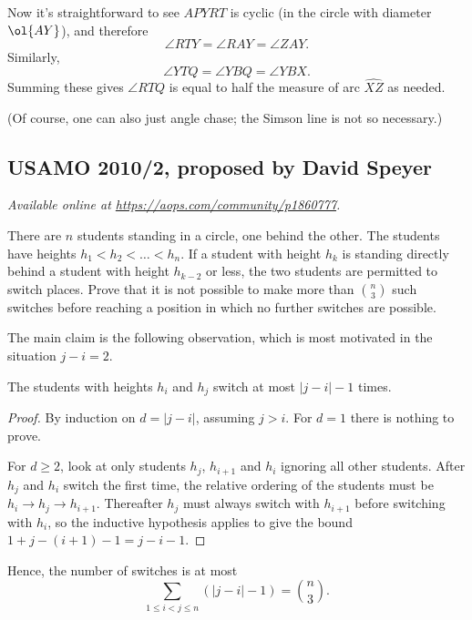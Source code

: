 \documentclass[11pt]{scrartcl}
\begin{document}
Now it's straightforward to see $APYRT$ is cyclic
(in the circle with diameter $\ol{AY}$),
and therefore
\[ \angle RTY = \angle RAY = \angle ZAY. \]
Similarly,
\[ \angle YTQ = \angle YBQ = \angle YBX. \]
Summing these gives $\angle RTQ$ is equal to
half the measure of arc $\widehat{XZ}$ as needed.

(Of course, one can also just angle chase;
the Simson line is not so necessary.)
\pagebreak

\subsection{USAMO 2010/2, proposed by David Speyer}
\textsl{Available online at \url{https://aops.com/community/p1860777}.}
\begin{mdframed}[style=mdpurplebox,frametitle={Problem statement}]
There are $n$ students standing in a circle, one behind the other.
The students have heights $h_1<h_2<\dots <h_n$.
If a student with height $h_k$ is standing directly
behind a student with height $h_{k-2}$ or less,
the two students are permitted to switch places.
Prove that it is not possible to make more than
$\binom{n}{3}$ such switches
before reaching a position in which no
further switches are possible.
\end{mdframed}
The main claim is the following observation,
which is most motivated in the situation $j-i = 2$.
\begin{claim*}
  The students with heights $h_i$ and $h_j$
  switch at most $|j-i|-1$ times.
\end{claim*}
\begin{proof}
  By induction on $d = |j-i|$, assuming $j > i$.
  For $d = 1$ there is nothing to prove.

  For $d \ge 2$, look at only students $h_j$, $h_{i+1}$
  and $h_{i}$ ignoring all other students.
  After $h_j$ and $h_i$ switch the first time,
  the relative ordering of the students must be
  $h_i \to h_j \to h_{i+1}$.
  Thereafter $h_j$ must always switch with $h_{i+1}$
  before switching with $h_i$,
  so the inductive hypothesis applies to give the bound
  $1 + j - (i+1) - 1 = j-i - 1$.
\end{proof}
Hence, the number of switches is at most
\[ \sum_{1 \le i < j \le n} \left( |j-i| - 1 \right) = \binom n3. \]
\pagebreak
\end{document}
